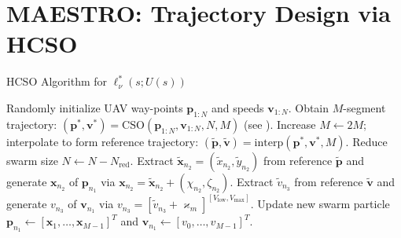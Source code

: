 \documentclass[10pt, twocolumn]{IEEEtran}
\theoremstyle{plain}
\theoremstyle{definition}
\theoremstyle{remark}
\begin{document}
\section{MAESTRO: Trajectory Design via HCSO}\label{S4}
\begin{algorithm*}[t]
\caption{HCSO Algorithm for $\ell_{\nu}^* (s; U(s))$}\label{A3}
    \begin{algorithmic}[1]
        \scriptsize
    	\State Randomly initialize UAV way-points $\mathbf p_{1:N}$ and speeds  $\mathbf v_{1:N}$.
    		\State Obtain $M$-segment trajectory: $(\mathbf p^*, \mathbf v^*) = \mathrm{CSO}(\mathbf p_{1:N}, \mathbf v_{1:N},N,M)$ (see \cite{CSO}).
    		\State Increase $M \gets 2M$; interpolate to form reference trajectory: $(\tilde{\mathbf p}, \tilde{\mathbf v}) = \mathrm{interp}(\mathbf p^*, \mathbf v^*, M)$.
    		\State Reduce swarm size $N \gets N - N_{\mathrm{red}}$.
    				\State Extract $\tilde{\mathbf x}_{n_2} = (\tilde{x}_{n_2},\tilde{y}_{n_2})$ from reference $\tilde{\mathbf p}$ and generate $\mathbf x_{n_2}$ of $\mathbf p_{n_1}$ via $\mathbf{x}_{n_2}{=}\tilde{\mathbf{x}}_{n_2}{+}(\chi_{n_2},\zeta_{n_2})$.
    			\EndFor
    				\State Extract $\tilde v_{n_3}$ from reference $\tilde{\mathbf v}$ and generate $v_{n_3}$ of $\mathbf v_{n_1}$ via $v_{n_3}{=}[\tilde{v}_{n_3}{+}\varkappa_m]^{[V_{\mathrm{low}},V_{\mathrm{max}}]}$.
    			\EndFor
    			\State Update new swarm particle $\mathbf p_{n_1} \gets [\mathbf x_{1},\dots,\mathbf x_{M-1}]^T$ and $\mathbf v_{n_1} \gets [v_0, \dots, v_{M-1}]^T$.
    		\EndFor
    	\EndWhile
    \end{algorithmic}
\end{algorithm*}
\end{document}
